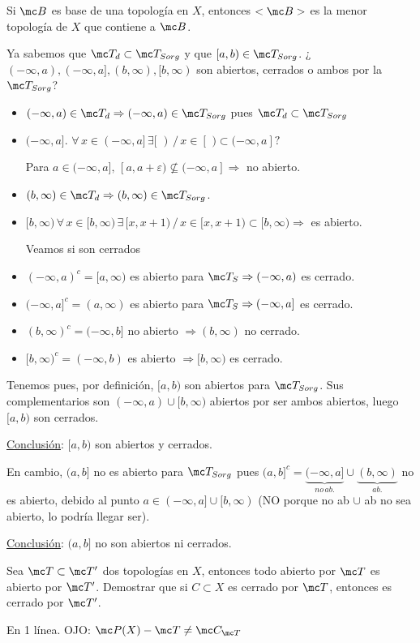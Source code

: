 \begin{ejer}
Si $\mc B$ es base de una topolog\'ia en $X$, entonces $<\mc B>$ es la menor topolog\'ia de $X$ que contiene a $\mc B$.
\end{ejer}
\begin{ejer}
Ya sabemos que $\mc T_d\subset \mc T_{Sorg}$ y que $[a,b)\in \mc T_{Sorg}$. ¿$(-\infty,a), (-\infty,a], (b,\infty), [b,\infty)$ son abiertos, cerrados o ambos por la $\mc T_{Sorg}$? 
\begin{itemize}
    \item $(-\infty, a) \in \mc T_d \Rightarrow (-\infty, a) \in \mc T_{Sorg}$ pues $\mc T_d\subset \mc T_{Sorg}$
    \item $(-\infty,a]$. $\forall \, x\in (-\infty,a] \, \exists [\,\,)\, / \, x\in [\,\,) \subset(-\infty,a]?$
    
    Para $a\in (-\infty,a], \, [a,a+\varepsilon) \nsubseteq (-\infty,a]\Rightarrow $ no abierto.
    \item $(b,\infty) \in \mc T_d \Rightarrow (b,\infty)\in \mc T_{Sorg}$.
    \item $[b,\infty)\, \forall \, x\in [b,\infty)\, \exists\,[x,x+1) \, / \, x \in [x,x+1) \subset [b, \infty) \Rightarrow $ es abierto.
    
    Veamos si son cerrados
    \item  $(-\infty,a)^c=[a,\infty)$ es abierto para $\mc T_S \Rightarrow (-\infty,a)$ es cerrado.
    \item $(-\infty,a]^c = (a,\infty)$ es abierto para $\mc T_S \Rightarrow (-\infty,a]$ es cerrado.
    \item $(b,\infty)^c = (-\infty,b]$ no abierto $\Rightarrow (b,\infty)$ no cerrado.
    \item $[b,\infty)^c = (-\infty, b)$ es abierto $\Rightarrow [b,\infty)$ es cerrado.
\end{itemize}
Tenemos pues, por definici\'on, $[a,b)$ son abiertos para $\mc T_{Sorg}$. Sus complementarios son $(-\infty,a) \cup [b,\infty)$ abiertos por ser ambos abiertos, luego $[a,b)$ son cerrados. 

\underline{Conclusi\'on}: $[a,b)$ son abiertos y cerrados.

En cambio, $(a,b]$ no es abierto para $\mc T_{Sorg}$ pues $(a,b]^c = \underbrace{(-\infty,a]}_{no \, ab.}\cup \underbrace{(b,\infty)}_{ab.}$ no es abierto, debido al punto $a\in (-\infty,a]\cup [b,\infty)$ (NO porque no ab $\cup$ ab no sea abierto, lo podr\'ia llegar ser).

\underline{Conclusi\'on}: $(a,b]$ no son abiertos ni cerrados.
\end{ejer}
\begin{ejer}
    Sea $\mc T \subset \mc T'$ dos topolog\'ias en $X$, entonces todo abierto por $\mc T$ es abierto por $\mc T'$. Demostrar que si $C \subset X$ es cerrado por $\mc T$, entonces es cerrado por $\mc T'$. 
\end{ejer}
\begin{sol}
En 1 l\'inea. OJO: $\mc P(X) - \mc T \neq \mc C_{\mc T}$
\end{sol}
